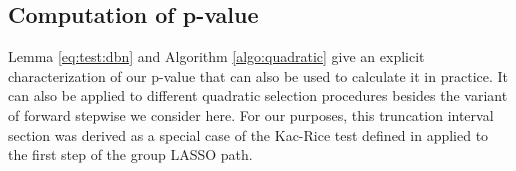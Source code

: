 \documentclass{imsart}
\newcommand{\todo}{\textcolor{red}{\textbf{To do: }}}
\begin{document}
%
%
%
%
%
%

\subsection{Computation of p-value}

Lemma \ref{eq:test:dbn} and Algorithm \ref{algo:quadratic} give an explicit characterization of our p-value
that can also be used to calculate it in practice. It can also be applied to different
quadratic selection procedures besides the variant of forward
stepwise we consider here. For our purposes,
this truncation interval 
section was derived as a special case of the
Kac-Rice test  defined in \cite{tests:adaptive} applied to the first step of the group LASSO path.
\end{document}
